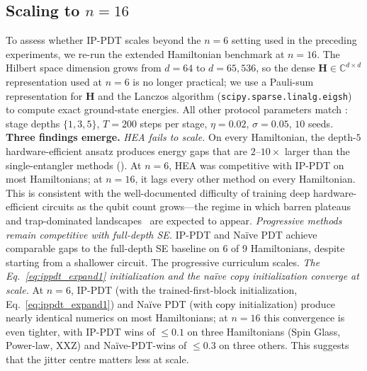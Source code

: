 \documentclass[11pt]{article}
\newcommand{\bbC}{\mathbb{C}}
\theoremstyle{plain}
\theoremstyle{plain}
\begin{document}
\subsection{Scaling to $n=16$}\label{sec:exp_n16}
To assess whether IP-PDT scales beyond the $n=6$ setting used in the
preceding experiments, we re-run the extended Hamiltonian benchmark at
$n=16$.  The Hilbert space dimension grows from $d=64$ to $d=65{,}536$,
so the dense $\mathbf{H}\in\bbC^{d\times d}$ representation used at $n=6$ is no
longer practical; we use a Pauli-sum representation for $\mathbf{H}$ and the
Lanczos algorithm (\texttt{scipy.sparse.linalg.eigsh}) to compute exact
ground-state energies.  All other protocol parameters match
: stage depths $\{1,3,5\}$, $T=200$ steps per
stage, $\eta=0.02$, $\sigma=0.05$, $10$ seeds.
\textbf{Three findings emerge.}
\emph{HEA fails to scale.}  On every Hamiltonian, the depth-$5$
hardware-efficient ansatz produces energy gaps that are $2$--$10\times$
larger than the single-entangler methods ().
At $n=6$, HEA was competitive with IP-PDT on most Hamiltonians; at
$n=16$, it lags every other method on every Hamiltonian.  This is
consistent with the well-documented difficulty of training deep
hardware-efficient circuits as the qubit count grows---the regime in
which barren plateaus~\cite{mcclean2018barren} and trap-dominated
landscapes~\cite{anschuetz2022beyond} are expected to appear.
\emph{Progressive methods remain competitive with full-depth SE.}
IP-PDT and Na\"ive PDT achieve comparable gaps to the full-depth SE
baseline on 6 of 9 Hamiltonians, despite starting from a shallower
circuit.  The progressive curriculum scales.
\emph{The Eq.~\eqref{eq:ippdt_expand1} initialization and the na\"ive
copy initialization converge at scale.}  At $n=6$, IP-PDT (with the
trained-first-block initialization, Eq.~\ref{eq:ippdt_expand1}) and
Na\"ive PDT (with \textcolor{black}{copy} initialization) produce nearly identical
numerics on most Hamiltonians; at $n=16$ this convergence is even
tighter, with IP-PDT wins of $\le 0.1$ on three Hamiltonians (Spin
Glass, Power-law, XXZ) and Na\"ive-PDT-wins of $\le 0.3$ on three others.
This suggests that the jitter centre matters less at scale.
\end{document}
